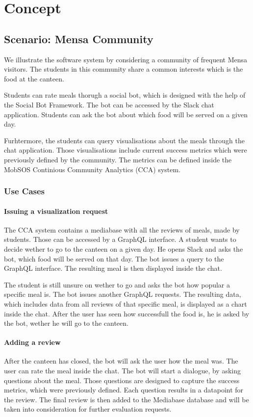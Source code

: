 \chapter{Concept}
\section{Scenario: Mensa Community}
We illustrate the software system by considering a community of frequent Mensa visitors. The students in this community share a common interests which is the food at the canteen.

Students can rate meals thorugh a social bot, which is designed with the help of the Social Bot Framework. The bot can be accessed by the Slack chat application. Students can ask the bot about which food will be served on a given day.

Furhtermore, the students can query visualisations about the meals through the chat application. Those visualisations include current success metrics which were previously defined by the community. The metrics can be defined inside the MobSOS Continious Community Analytics (CCA) system.

\subsection{Use Cases}

\subsubsection{Issuing a visualization request} The CCA system contains a mediabase with all the reviews of meals, made by students. Those can be accessed by a GraphQL interface. A student wants to decide wether to go to the canteen on a given day. He opens Slack and asks the bot, which food will be served on that day. The bot issues a query to the GraphQL interface. The resulting meal is then displayed inside the chat.

The student is still unsure on wether to go and asks the bot how popular a specific meal is. The bot issues another GraphQL requests. The resulting data, which includes data from all reviews of that specific meal, is displayed as a chart inside the chat. After the user has seen how successfull the food is, he is asked by the bot, wether he will go to the canteen.

\subsubsection{Adding a review} After the canteen has closed, the bot will ask the user how the meal was. The user can rate the meal inside the chat. The bot will start a dialogue, by asking questions about the meal. Those questions are designed to capture the success metrics, which were previously defined. Each question results in a datapoint for the review. The final review is then added to the Mediabase database and will be taken into consideration for further evaluation requests.

